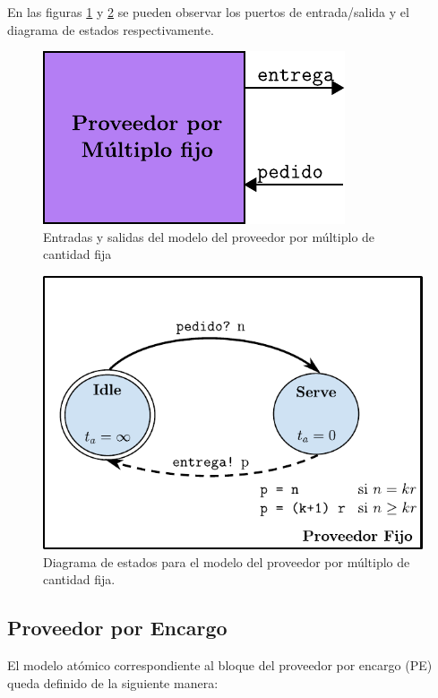 \documentclass[10pt]{article}
\begin{document}
En las figuras \ref{fig:PF-esquematico} y \ref{fig:PF-estados} se pueden observar los puertos de entrada/salida y el diagrama de estados respectivamente.

\begin{figure}[htbp]
	\centering
	\includegraphics{img/PF-esquematico}
	\caption{Entradas y salidas del modelo del proveedor por múltiplo de cantidad fija}
	\label{fig:PF-esquematico}
\end{figure}

\begin{figure}[htbp]
	\centering
	\includegraphics{img/proveedorFijodevsgraph}
	\caption{Diagrama de estados para el modelo del proveedor por múltiplo de cantidad fija.}
	\label{fig:PF-estados}
\end{figure}
\FloatBarrier

\subsection{Proveedor por Encargo\label{sec:PE}}
El modelo atómico correspondiente al bloque del proveedor por encargo (PE) queda definido de la siguiente manera:
\end{document}

